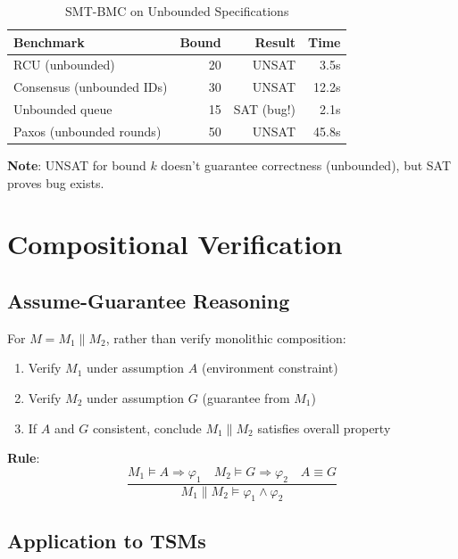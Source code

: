 \documentclass[conference]{IEEEtran}
\begin{document}
\begin{table}[h]
\centering
\caption{SMT-BMC on Unbounded Specifications}
\label{tab:smt_results}
\begin{tabular}{lrrr}
\toprule
\textbf{Benchmark} & \textbf{Bound} & \textbf{Result} & \textbf{Time} \\
\midrule
RCU (unbounded) & 20 & UNSAT & 3.5s \\
Consensus (unbounded IDs) & 30 & UNSAT & 12.2s \\
Unbounded queue & 15 & SAT (bug!) & 2.1s \\
Paxos (unbounded rounds) & 50 & UNSAT & 45.8s \\
\bottomrule
\end{tabular}
\end{table}

\textbf{Note}: UNSAT for bound $k$ doesn't guarantee correctness (unbounded), but SAT proves bug exists.

\section{Compositional Verification}
\label{sec:compositional}

\subsection{Assume-Guarantee Reasoning}

For $M = M_1 \parallel M_2$, rather than verify monolithic composition:

\begin{enumerate}
\item Verify $M_1$ under assumption $A$ (environment constraint)
\item Verify $M_2$ under assumption $G$ (guarantee from $M_1$)
\item If $A$ and $G$ consistent, conclude $M_1 \parallel M_2$ satisfies overall property
\end{enumerate}

\textbf{Rule}:
\begin{equation}
\frac{M_1 \models A \Rightarrow \varphi_1 \quad M_2 \models G \Rightarrow \varphi_2 \quad A \equiv G}{M_1 \parallel M_2 \models \varphi_1 \wedge \varphi_2}
\end{equation}

\subsection{Application to TSMs}
\end{document}
